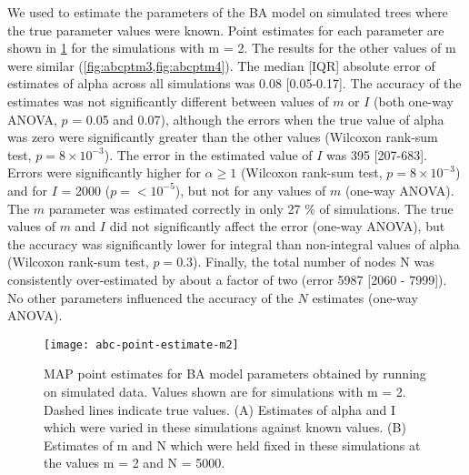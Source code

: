 We used  to estimate the parameters of the \gls{BA} model on
simulated trees where the true parameter values were known. Point estimates for
each parameter are shown in \cref{fig:abcptm2} for the simulations with \gls{m} =
2. The results for the other values of \gls{m} were similar
(\cref{fig:abcptm3,fig:abcptm4}). The median [IQR] absolute error of estimates of
\gls{alpha} across all simulations was
    0.08 
    [0.05-0.17].
The accuracy of the estimates was not significantly different between values of
$m$ or $I$ (both one-way ANOVA,
    $p$ = 0.05
and 
    0.07),
although the errors when the true value of \gls{alpha} was zero were
significantly greater than the other values 
    (Wilcoxon rank-sum test, $p = 8\!\times\!10^{-3}$).
The error in the estimated value of $I$ was
    395 
    [207-683].
Errors were significantly higher for $\alpha \geq 1$
    (Wilcoxon rank-sum test, $p = 8\!\times\!10^{-3}$)
and for $I$ = 2000
    ($p = {<}10^{-5}$),
but not for any values of $m$ (one-way ANOVA). The $m$ parameter was estimated
correctly in only
    27 \%
of simulations. The true values of $m$ and $I$ did not significantly affect the
error (one-way ANOVA), but the accuracy was significantly lower for integral
than non-integral values of \gls{alpha}
    (Wilcoxon rank-sum test, $p = 0.3$).
Finally, the total number of nodes \gls{N} was consistently over-estimated by
about a factor of two
    (error 5987 
    [2060 - 
     7999]).
No other parameters influenced the accuracy of the $N$ estimates (one-way
ANOVA).

\begin{figure}
  \texttt{[image: abc-point-estimate-m2]}
  \caption[\Acrlong{MAP} point estimates for \gls{BA} model parameters obtained
    by running  on simulated data, for simulations with $m = 2$.] 
  {
    \Acrlong{MAP} point estimates for \gls{BA} model parameters obtained by         
    running  on simulated data. Values shown are for               
    simulations with \gls{m} = 2. Dashed lines indicate true values. (A)            
    Estimates of \gls{alpha} and \gls{I} which were varied in these simulations  
    against known values. (B) Estimates of \gls{m} and \gls{N} which were held   
    fixed in these simulations at the values \gls{m} = 2 and \gls{N} = 5000. 
  }
  \label{fig:abcptm2}
\end{figure}




